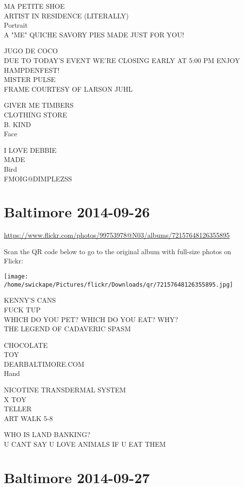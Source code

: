 \documentclass[10pt,letterpaper]{article}
\begin{document}
MA PETITE SHOE\\
ARTIST IN RESIDENCE (LITERALLY)\\
Portrait\\
A "ME" QUICHE SAVORY PIES MADE JUST FOR YOU!

JUGO DE COCO\\
DUE TO TODAY'S EVENT WE'RE CLOSING EARLY AT 5:00 PM ENJOY HAMPDENFEST!\\
MISTER PULSE\\
FRAME COURTESY OF LARSON JUHL

GIVER ME TIMBERS\\
CLOTHING STORE\\
B. KIND\\
Face

I LOVE DEBBIE\\
MADE\\
Bird\\
FMOIG@DIMPLEZSS


\section*{Baltimore 2014-09-26}

\url{https://www.flickr.com/photos/99753978@N03/albums/72157648126355895}

Scan the QR code below to go to the original album with full-size photos on Flickr:

\texttt{[image: /home/swickape/Pictures/flickr/Downloads/qr/72157648126355895.jpg]}


KENNY'S CANS\\
FUCK TUP\\
WHICH DO YOU PET?  WHICH DO YOU EAT?  WHY?\\
THE LEGEND OF CADAVERIC SPASM

CHOCOLATE\\
TOY\\
DEARBALTIMORE.COM\\
Hand

NICOTINE TRANSDERMAL SYSTEM\\
X TOY\\
TELLER\\
ART WALK 5{-}8

WHO IS LAND BANKING?\\
U CANT SAY U LOVE ANIMALS IF U EAT THEM


\section*{Baltimore 2014-09-27}
\end{document}
